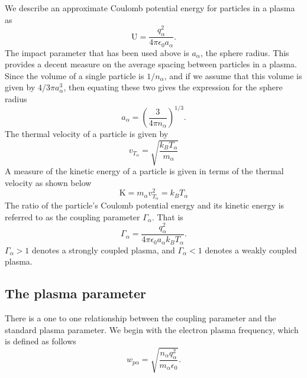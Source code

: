 \documentclass[a4paper,11pt]{report}
\begin{document}
We describe an approximate Coulomb potential energy for particles in a plasma as
\begin{equation}
    \text{U} =  \frac{q_\alpha^2}{4 \pi \epsilon_0 a_\alpha}.
\end{equation}
The impact parameter that has been used above is $a_\alpha$, the sphere radius. This provides a decent measure on the average spacing between particles in a plasma. Since the volume of a single particle is $1/n_\alpha$, and if we assume that this volume is given by $4/3 \pi a_\alpha^3$, then equating these two gives the expression for the sphere radius
\begin{equation}
    a_\alpha = \left ( \frac{3}{4 \pi n_\alpha} \right )^{1/3}.
\end{equation}
The thermal velocity of a particle is given by
\begin{equation}
    v_{T_\alpha} = \sqrt{\frac{k_B T_\alpha}{m_\alpha}}
\end{equation}
A measure of the kinetic energy of a particle is given in terms of the thermal velocity as shown below
\begin{equation}
    \text{K} = m_\alpha v_{T_\alpha}^2 = k_B T_\alpha
\end{equation}
The ratio of the particle's Coulomb potential energy and its kinetic energy is referred to as the coupling parameter $\Gamma_\alpha$. That is 
\begin{equation}
    \Gamma_\alpha = \frac{q_\alpha^2}{4 \pi \epsilon_0 a_\alpha k_B T_\alpha}.
\end{equation}
$\Gamma_\alpha > 1$ denotes a strongly coupled plasma, and $\Gamma_\alpha < 1$ denotes a weakly coupled plasma. 

\subsection{The plasma parameter}
There is a one to one relationship between the coupling parameter and the standard plasma parameter. We begin with the electron plasma frequency, which is defined as follows
\begin{equation}
    w_{p\alpha} = \sqrt{\dfrac{n_\alpha q_\alpha^2}{m_\alpha \epsilon_0}}.
\end{equation}
\end{document}
